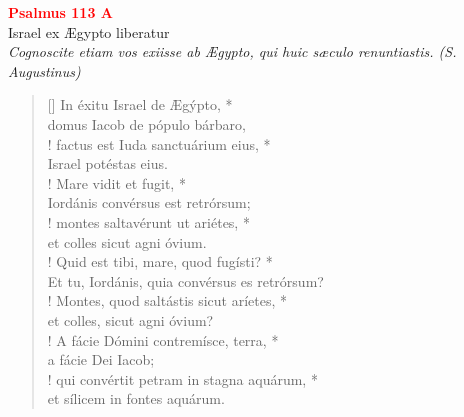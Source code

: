 
\def\greinitialformat#1{%
{\fontsize{39}{39}\selectfont #1}%
}




\vspace{0.3cm}
\begin{center}
 \textcolor{red}{\large \bf Psalmus 113 A}\\
Israel ex Ægypto liberatur\\
\textit{\small Cognoscite etiam vos exiisse ab Ægypto, qui huic sæculo renuntiastis. (S. Augustinus)}
\end{center}
\begin{verse}[\versewidth]
In éxitu Israel de Ægýpto, *\\
domus Iacob de pópulo bárbaro,\\!
\vin  factus est Iuda sanctuárium eius, *\\
\vin  Israel potéstas eius.\\!
Mare vidit et fugit, *\\
Iordánis convérsus est retrórsum;\\! %
\vin  montes saltavérunt ut ariétes, *\\
\vin  et colles sicut agni óvium.\\!
Quid est tibi, mare, quod fugísti? *\\
Et tu, Iordánis, quia convérsus es retrórsum?\\!
\vin  Montes, quod saltástis sicut aríetes, *\\
\vin  et colles, sicut agni óvium?\\!
A fácie Dómini contremísce, terra, *\\
a fácie Dei Iacob;\\!
\vin  qui convértit petram in stagna aquárum, *\\
\vin  et sílicem in fontes aquárum.
\end{verse}
\vspace{1cm}


